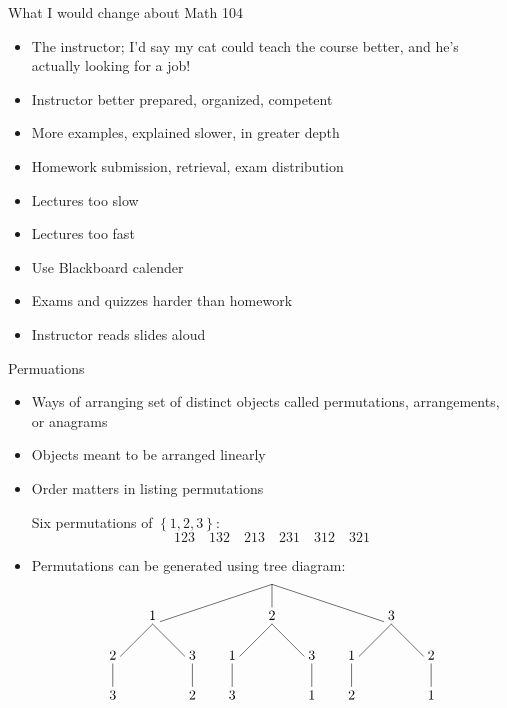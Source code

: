 \documentclass[handout]{beamer}
\theoremstyle{definition}
\begin{document}
\begin{frame}{What I would change about Math 104}
\begin{itemize}
\item The instructor; I'd say my cat could teach the
course better, and he's actually looking for a job!
\item Instructor better prepared, organized, competent
\item More examples, explained slower, in greater depth
\item Homework submission, retrieval, exam distribution
\item Lectures too slow
\item Lectures too fast
\item Use Blackboard calender
\item Exams and quizzes harder than homework
\item Instructor reads slides aloud
\end{itemize}
\end{frame}

\begin{frame}{Permuations}
\begin{itemize}
\item Ways of arranging set of distinct objects called
\alert{permutations}, \alert{arrangements}, or \alert{anagrams}
\item Objects meant to be arranged linearly
\item Order matters in listing permutations
\begin{example} Six permutations of $\left\{1,2,3\right\}$:
\[123\quad 132\quad 213\quad 231\quad 312\quad 321\]
\end{example}
\item Permutations can be generated using tree diagram:
\[\begin{xy}<1cm,0cm>:
(0,0)="0";
(-3,-1)="-31";
(0,-1)="01";
(3,-1)="31";
"0";"-31"*+!D{1}**\dir{-};
"0";"01"*+!D{2}**\dir{-};
"0";"31"*+!D{3}**\dir{-};
"-31";(-4,-2)*+!D{2}**\dir{-};
(-4,-3)*+!D{3}**\dir{-};
"-31";(-2,-2)*+!D{3}**\dir{-};
(-2,-3)*+!D{2}**\dir{-};
"01";(-1,-2)*+!D{1}**\dir{-};
(-1,-3)*+!D{3}**\dir{-};
"01";(1,-2)*+!D{3}**\dir{-};
(1,-3)*+!D{1}**\dir{-};
"31";(2,-2)*+!D{1}**\dir{-};
(2,-3)*+!D{2}**\dir{-};
"31";(4,-2)*+!D{2}**\dir{-};
(4,-3)*+!D{1}**\dir{-};
\end{xy}\]
\end{itemize}
\end{frame}
\end{document}
